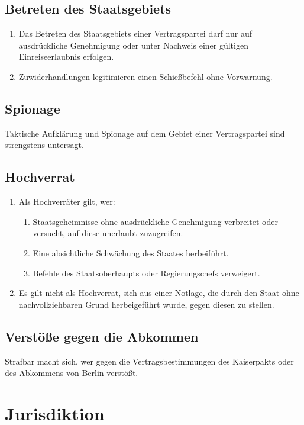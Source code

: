 \documentclass{article}
\begin{document}
\subsection{Betreten des Staatsgebiets}
\begin{enumerate}[(1)]
    \item Das Betreten des Staatsgebiets einer Vertragspartei darf nur auf ausdrückliche Genehmigung oder unter Nachweis einer gültigen Einreiseerlaubnis erfolgen.
    \item Zuwiderhandlungen legitimieren einen Schießbefehl ohne Vorwarnung.
\end{enumerate}

\subsection{Spionage}
Taktische Aufklärung und Spionage auf dem Gebiet einer Vertragspartei sind strengstens untersagt.

\subsection{Hochverrat}
\begin{enumerate}[(1)]
    \item Als Hochverräter gilt, wer:
    \begin{enumerate}[1.]
        \item Staatsgeheimnisse ohne ausdrückliche Genehmigung verbreitet oder versucht, auf diese unerlaubt zuzugreifen.
        \item Eine absichtliche Schwächung des Staates herbeiführt.
        \item Befehle des Staatsoberhaupts oder Regierungschefs verweigert.
    \end{enumerate}
    \item Es gilt nicht als Hochverrat, sich aus einer Notlage, die durch den Staat ohne nachvollziehbaren Grund herbeigeführt wurde, gegen diesen zu stellen.
\end{enumerate}

\subsection{Verstöße gegen die Abkommen}
Strafbar macht sich, wer gegen die Vertragsbestimmungen des Kaiserpakts oder des Abkommens von Berlin verstößt.

\section{Jurisdiktion}
\end{document}
